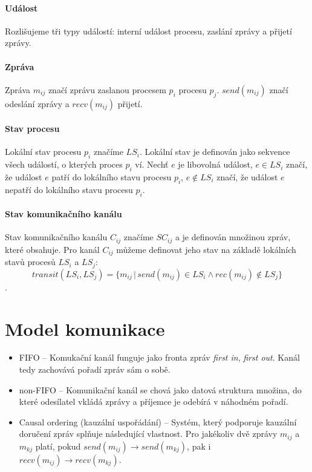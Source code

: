 \paragraph*{Událost} Rozlišujeme tři typy událostí: interní událost procesu, zaslání zprávy a přijetí zprávy.

\paragraph*{Zpráva} Zpráva $m_{ij}$ značí zprávu zaslanou procesem $p_i$ procesu $p_j$. $send(m_{ij})$ značí odeslání zprávy a $recv(m_{ij})$ přijetí.

\paragraph*{Stav procesu} Lokální stav procesu $p_i$ značíme $LS_i$. Lokální stav je definován jako sekvence všech událostí, o kterých proces $p_i$ ví. Nechť $e$ je libovolná událost, $e \in LS_i$ značí, že událost $e$ patří do lokálního stavu procesu $p_i$, $e \not\in LS_i$ značí, že událost $e$ nepatří do lokálního stavu procesu $p_i$.

\paragraph*{Stav komunikačního kanálu} Stav komunikačního kanálu $C_{ij}$ značíme $SC_{ij}$ a je definován množinou zpráv, které obsahuje. Pro kanál $C_{ij}$ můžeme definovat jeho stav na základě lokálních stavů procesů $LS_i$ a $LS_j$: $$
transit(LS_i, LS_j) = \{ m_{ij} \,|\, send(m_{ij}) \in LS_i \land rec(m_{ij}) \not\in LS_j \}
$$.

\section{Model komunikace}

\begin{itemize}
    \item FIFO -- Komukační kanál funguje jako fronta zpráv \textit{first in}, \textit{first out}. Kanál tedy zachovává pořadí zpráv sám o sobě.

    \item non-FIFO -- Komunikační kanál se chová jako datová struktura množina, do které odesílatel vkládá zprávy a příjemce je odebírá v náhodném pořadí.

    \item Causal ordering (kauzální uspořádání) -- Systém, který podporuje kauzální doručení zpráv splňuje následující vlastnost. Pro jakékoliv dvě zprávy $m_{ij}$ a $m_{kj}$ platí, pokud $send(m_{ij}) \rightarrow send(m_{kj})$, pak i $recv(m_{ij}) \rightarrow recv(m_{kj})$.
\end{itemize}

